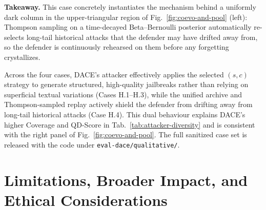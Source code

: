 \documentclass{article}
\newcommand{\method}{\textsc{DACE}\xspace}
\begin{document}
\begin{tcolorbox}
\textbf{Takeaway.} This case concretely instantiates the mechanism behind a uniformly dark column in the upper-triangular region of Fig.~\ref{fig:coevo-and-pool} (left): Thompson sampling on a time-decayed Beta--Bernoulli posterior automatically re-selects long-tail historical attacks that the defender may have drifted away from, so the defender is continuously rehearsed on them before any forgetting crystallizes.
\end{tcolorbox}

Across the four cases, \method's attacker effectively applies the selected $(s,c)$ strategy to generate structured, high-quality jailbreaks rather than relying on superficial textual variations (Cases H.1--H.3), while the unified archive and Thompson-sampled replay actively shield the defender from drifting away from long-tail historical attacks (Case H.4). This dual behaviour explains \method's higher Coverage and QD-Score in Tab.~\ref{tab:attacker-diversity} and is consistent with the right panel of Fig.~\ref{fig:coevo-and-pool}. The full sanitized case set is released with the code under \texttt{eval-dace/qualitative/}.


\section{Limitations, Broader Impact, and Ethical Considerations}
\label{apdx:limitations}

\end{document}

